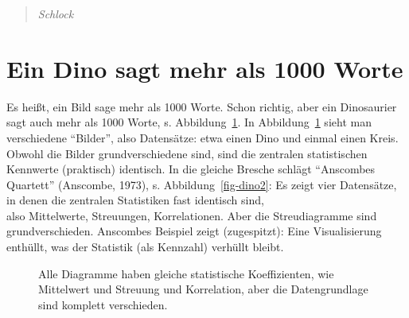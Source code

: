 \documentclass[
  a4paper,
]{scrbook}
\theoremstyle{definition}
\theoremstyle{definition}
\theoremstyle{definition}
\theoremstyle{remark}
\begin{document}
\begin{quote}
{} \emph{Schlock}
\end{quote}

\section{Ein Dino sagt mehr als 1000
Worte}\label{ein-dino-sagt-mehr-als-1000-worte}

Es heißt, ein Bild sage mehr als 1000 Worte. Schon richtig, aber ein
Dinosaurier sagt auch mehr als 1000 Worte, s. Abbildung~\ref{fig-dino1}.
In Abbildung~\ref{fig-dino1} sieht man verschiedene ``Bilder'', also
Datensätze: etwa einen Dino und einmal einen Kreis. Obwohl die Bilder
grundverschiedene sind, sind die zentralen statistischen Kennwerte
(praktisch) identisch. In die gleiche Bresche schlägt ``Anscombes
Quartett'' (Anscombe, 1973), s. Abbildung~\ref{fig-dino2}: Es zeigt vier
Datensätze, in denen die zentralen Statistiken fast identisch sind,\\
also Mittelwerte, Streuungen, Korrelationen. Aber die Streudiagramme
sind grundverschieden. Anscombes Beispiel zeigt (zugespitzt): Eine
Visualisierung enthüllt, was der Statistik (als Kennzahl) verhüllt
bleibt.

\begin{figure}


\caption{\label{fig-dino1}Alle Diagramme haben gleiche statistische
Koeffizienten, wie Mittelwert und Streuung und Korrelation, aber die
Datengrundlage sind komplett verschieden.}

\end{figure}%
\end{document}
